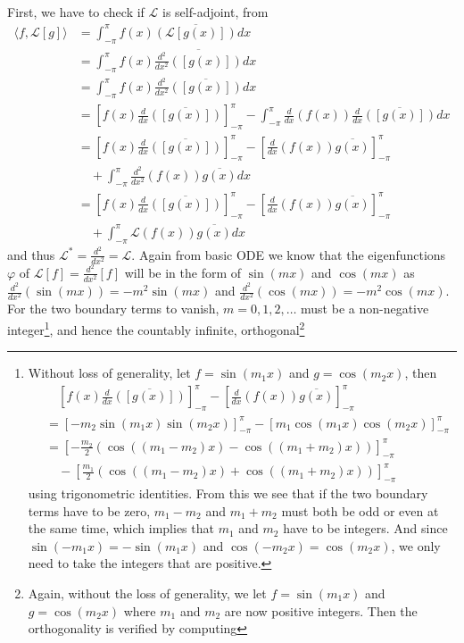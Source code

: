 \begin{solution}
First, we have to check if $\mathcal{L}$ is self-adjoint, from
\begin{align*}
\langle f,\mathcal{L}[g] \rangle &= \int_{-\pi}^\pi f(x) \overline{(\mathcal{L}[g(x)])} dx \\  
&= \int_{-\pi}^\pi f(x) \overline{\frac{d^2}{dx^2}([g(x)])} dx \\
&= \int_{-\pi}^\pi f(x) \frac{d^2}{dx^2}\overline{([g(x)])} dx \\
&= [f(x) \frac{d}{dx}\overline{([g(x)])}]_{-\pi}^\pi - \int_{-\pi}^\pi \frac{d}{dx}(f(x)) \frac{d}{dx}\overline{([g(x)])} dx \\
&= [f(x) \frac{d}{dx}\overline{([g(x)])}]_{-\pi}^\pi - [\frac{d}{dx}(f(x)) \overline{g(x)}]_{-\pi}^\pi \\
&\quad + \int_{-\pi}^\pi \frac{d^2}{dx^2}(f(x)) \overline{g(x)} dx \\
&= [f(x) \frac{d}{dx}\overline{([g(x)])}]_{-\pi}^\pi - [\frac{d}{dx}(f(x)) \overline{g(x)}]_{-\pi}^\pi \\
&\quad + \int_{-\pi}^\pi \mathcal{L}(f(x)) \overline{g(x)} dx
\end{align*}
and thus $\mathcal{L}^* = \frac{d^2}{dx^2} = \mathcal{L}$. Again from basic ODE we know that the eigenfunctions $\varphi$ of $\mathcal{L}[f] = \frac{d^2}{dx^2}[f]$ will be in the form of $\sin(mx)$ and $\cos(mx)$ as $\frac{d^2}{dx^2}(\sin(mx)) = -m^2\sin(mx)$ and $\frac{d^2}{dx^2}(\cos(mx)) = -m^2\cos(mx)$. For the two boundary terms to vanish, $m = 0, 1, 2, \ldots$ must be a non-negative integer\footnote{Without loss of generality, let $f = \sin(m_1 x)$ and $g = \cos(m_2 x)$, then
\begin{align*}
&\quad [f(x) \frac{d}{dx}\overline{([g(x)])}]_{-\pi}^\pi - [\frac{d}{dx}(f(x)) \overline{g(x)}]_{-\pi}^\pi \\
&= [-m_2\sin(m_1 x)\sin(m_2 x)]_{-\pi}^\pi - [m_1\cos(m_1 x)\cos(m_2 x)]_{-\pi}^\pi \\
&= [-\frac{m_2}{2}(\cos((m_1-m_2)x) - \cos((m_1+m_2)x))]_{-\pi}^\pi \\
&\quad - [\frac{m_1}{2}(\cos((m_1-m_2)x) + \cos((m_1+m_2)x))]_{-\pi}^\pi 
\end{align*}
using trigonometric identities. From this we see that if the two boundary terms have to be zero, $m_1 - m_2$ and $m_1 + m_2$ must both be odd or even at the same time, which implies that $m_1$ and $m_2$ have to be integers. And since $\sin(-m_1 x) = -\sin(m_1 x)$ and $\cos(-m_2 x) = \cos(m_2 x)$, we only need to take the integers that are positive.}, and hence the countably infinite, orthogonal\footnote{Again, without the loss of generality, we let $f = \sin(m_1 x)$ and $g = \cos(m_2 x)$ where $m_1$ and $m_2$ are now positive integers. Then the orthogonality is verified by computing
}
\end{solution}
